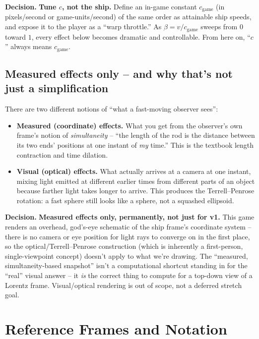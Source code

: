 \documentclass[11pt]{article}
\newcommand{\decision}[1]{\par\smallskip\noindent\textbf{Decision.} #1\par\smallskip}
\begin{document}
\decision{\textbf{Tune $c$, not the ship.} Define an in-game constant $c_{\mathrm{game}}$ (in pixels/second or game-units/second) of the same order as attainable ship speeds, and expose it to the player as a ``warp throttle.'' As $\beta = v/c_{\mathrm{game}}$ sweeps from $0$ toward $1$, every effect below becomes dramatic and controllable. From here on, ``$c$'' always means $c_{\mathrm{game}}$.}

\subsection{Measured effects only -- and why that's not just a simplification}
\label{sec:measured-vs-visual}

There are two different notions of ``what a fast-moving observer sees'':

\begin{itemize}[leftmargin=1.5em]
  \item \textbf{Measured (coordinate) effects.} What you get from the observer's own frame's notion of \emph{simultaneity} -- ``the length of the rod is the distance between its two ends' positions at one instant of \emph{my} time.'' This is the textbook length contraction and time dilation.
  \item \textbf{Visual (optical) effects.} What actually arrives at a camera at one instant, mixing light emitted at different earlier times from different parts of an object because farther light takes longer to arrive. This produces the Terrell--Penrose rotation: a fast sphere still looks like a sphere, not a squashed ellipsoid.
\end{itemize}

\decision{\textbf{Measured effects only, permanently, not just for v1.} This game renders an overhead, god's-eye schematic of the ship frame's coordinate system -- there is no camera or eye position for light rays to converge on in the first place, so the optical/Terrell--Penrose construction (which is inherently a first-person, single-viewpoint concept) doesn't apply to what we're drawing. The ``measured, simultaneity-based snapshot'' isn't a computational shortcut standing in for the ``real'' visual answer -- it \emph{is} the correct thing to compute for a top-down view of a Lorentz frame. Visual/optical rendering is out of scope, not a deferred stretch goal.}

\section{Reference Frames and Notation}
\label{sec:frames}
\end{document}
